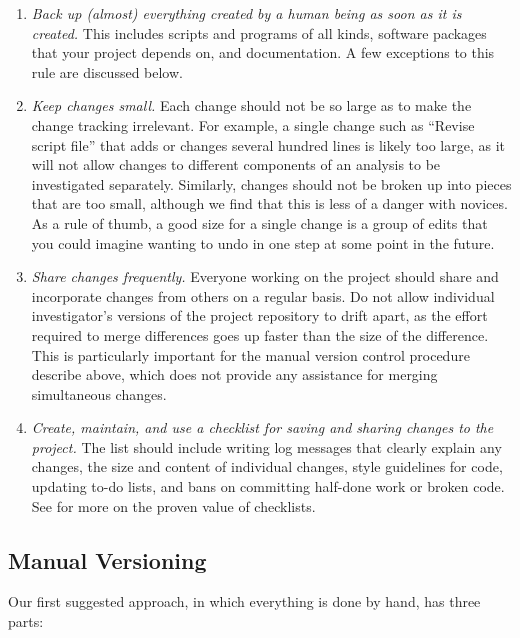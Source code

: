 \documentclass[10pt]{article}
\newcommand{\recommend}[1]{\textit{#1}}
\begin{document}
\begin{enumerate}

\item
  \recommend{Back up (almost) everything created by a human being as
    soon as it is created.} This includes scripts and programs of all
  kinds, software packages that your project depends on, and
  documentation. A few exceptions to this rule are discussed below.

\item
  \recommend{Keep changes small.}  Each change should not be so large
  as to make the change tracking irrelevant. For example, a single
  change such as ``Revise script file'' that adds or changes several
  hundred lines is likely too large, as it will not allow changes to
  different components of an analysis to be investigated
  separately. Similarly, changes should not be broken up into pieces
  that are too small, although we find that this is less of a danger
  with novices. As a rule of thumb, a good size for a single change is
  a group of edits that you could imagine wanting to undo in one step
  at some point in the future.

\item
  \recommend{Share changes frequently.} Everyone working on the
  project should share and incorporate changes from others on a
  regular basis.  Do not allow individual investigator's versions of
  the project repository to drift apart, as the effort required to
  merge differences goes up faster than the size of the
  difference. This is particularly important for the manual version
  control procedure describe above, which does not provide any
  assistance for merging simultaneous changes.

\item
  \recommend{Create, maintain, and use a checklist for saving and
    sharing changes to the project.}  The list should include writing
  log messages that clearly explain any changes, the size and content
  of individual changes, style guidelines for code, updating to-do
  lists, and bans on committing half-done work or broken code.  See
  \cite{gawande2011} for more on the proven value of checklists.

\end{enumerate}

\subsection*{Manual Versioning}

Our first suggested approach, in which everything is done by hand, has
three parts:
\end{document}
